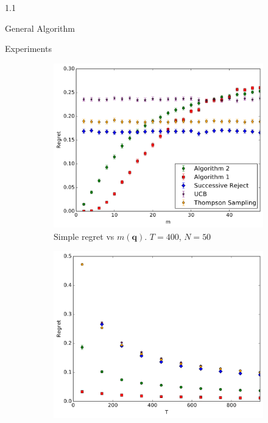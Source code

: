 \documentclass[12pt]{beamer}
\newlength{\onecolwid}
\begin{document}
\begin{frame}[t]
\begin{columns}[t]
\begin{column}{1.1\onecolwid}
\begin{block}{General Algorithm}
\end{block}
\begin{block}{Experiments}
\begin{figure}
    \begin{subfigure}[t]{0.3\textwidth}
		\centering    
    		\includegraphics[width=\textwidth]{experiment1_20161020_1247.pdf}
    		\caption{Simple regret vs $m(\boldsymbol{q})$. $T=400$, $N = 50$}
        \label{fig:simple_vs_m}
    \end{subfigure}\hfill
    \begin{subfigure}[t]{0.3\textwidth}
    		\centering
        \includegraphics[width=\textwidth]{experiment2_20161020_1249.pdf}

\end{subfigure}
\end{figure}
\end{block}
\end{column}
\end{columns}
\end{frame}
\end{document}
